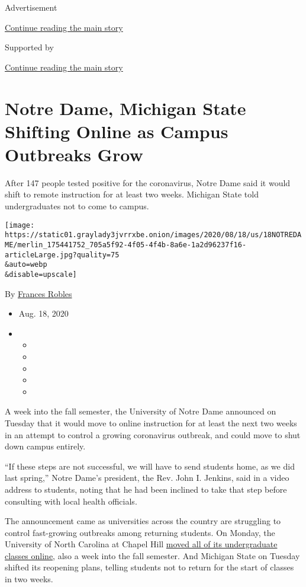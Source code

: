 Advertisement

\protect\hyperlink{after-top}{Continue reading the main story}

Supported by

\protect\hyperlink{after-sponsor}{Continue reading the main story}

\hypertarget{notre-dame-michigan-state-shifting-online-as-campus-outbreaks-grow}{%
\section{Notre Dame, Michigan State Shifting Online as Campus Outbreaks
Grow}\label{notre-dame-michigan-state-shifting-online-as-campus-outbreaks-grow}}

After 147 people tested positive for the coronavirus, Notre Dame said it
would shift to remote instruction for at least two weeks. Michigan State
told undergraduates not to come to campus.

\texttt{[image: https://static01.graylady3jvrrxbe.onion/images/2020/08/18/us/18NOTREDAME/merlin\_175441752\_705a5f92-4f05-4f4b-8a6e-1a2d96237f16-articleLarge.jpg?quality=75\\\&auto=webp\\\&disable=upscale]}

By \href{https://www.nytimes3xbfgragh.onion/by/frances-robles}{Frances
Robles}

\begin{itemize}
\item
  Aug. 18, 2020
\item
  \begin{itemize}
  \item
  \item
  \item
  \item
  \item
  \end{itemize}
\end{itemize}

A week into the fall semester, the University of Notre Dame announced on
Tuesday that it would move to online instruction for at least the next
two weeks in an attempt to control a growing coronavirus outbreak, and
could move to shut down campus entirely.

``If these steps are not successful, we will have to send students home,
as we did last spring,'' Notre Dame's president, the Rev. John I.
Jenkins, said in a video address to students, noting that he had been
inclined to take that step before consulting with local health
officials.

The announcement came as universities across the country are struggling
to control fast-growing outbreaks among returning students. On Monday,
the University of North Carolina at Chapel Hill
\href{https://www.nytimes3xbfgragh.onion/2020/08/17/us/unc-chapel-hill-covid.html}{moved
all of its undergraduate classes online}, also a week into the fall
semester. And Michigan State on Tuesday shifted its reopening plans,
telling students not to return for the start of classes in two weeks.

